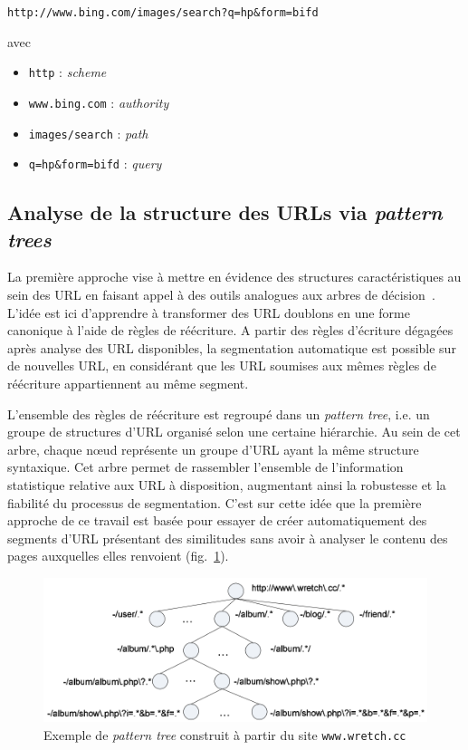 \documentclass[11pt, a4paper]{article}
\begin{document}
\begin{center}

\texttt{http://www.bing.com/images/search?q=hp\&form=bifd}

\end{center}

avec 

\begin{itemize}
	\item \texttt{http} : \textit{scheme} 
	\item \texttt{www.bing.com} : \textit{authority}
	\item \texttt{images/search} : \textit{path}
	\item \texttt{q=hp\&form=bifd} : \textit{query}
\end{itemize}

\subsection{Analyse de la structure des URLs via \textit{pattern trees}}

La première approche vise à mettre en évidence des structures caractéristiques au sein des URL en faisant appel à des outils analogues aux arbres de décision~\cite{lei}. L'idée est ici d'apprendre à transformer des URL doublons en une forme canonique à l'aide de règles de réécriture. A partir des règles d'écriture dégagées après analyse des URL disponibles, la segmentation automatique est possible sur de nouvelles URL, en considérant que les URL soumises aux mêmes règles de réécriture appartiennent au même segment.

L'ensemble des règles de réécriture est regroupé dans un \textit{pattern tree}, i.e. un groupe de structures d'URL organisé selon une certaine hiérarchie. Au sein de cet arbre, chaque nœud représente un groupe d'URL ayant la même structure syntaxique. Cet arbre permet de rassembler l'ensemble de l'information statistique relative aux URL à disposition, augmentant ainsi la robustesse et la fiabilité du processus de segmentation.
 C'est sur cette idée que la première approche de ce travail est basée pour essayer de créer automatiquement des segments d'URL présentant des similitudes sans avoir à analyser le contenu des pages auxquelles elles renvoient (fig.~\ref{pattern_tree}).

\begin{figure}[!h]
	\center
	\includegraphics[scale=0.6]{pattern_tree.png}
	\caption{Exemple de \textit{pattern tree} construit à partir du site \texttt{www.wretch.cc}}
	\label{pattern_tree}
\end{figure}
\end{document}
